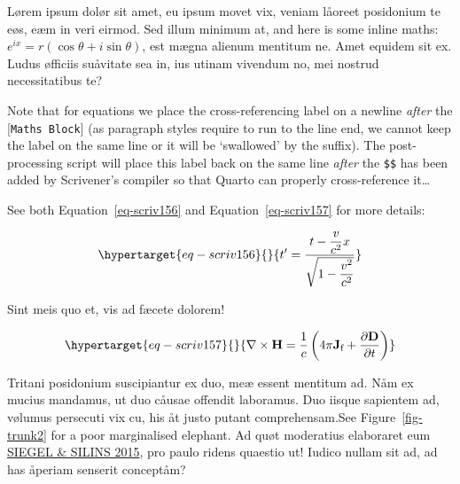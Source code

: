 \documentclass[
  12pt,
  a4paper,
  oneside,
  titlepage,
  toclink=all,
  toc=bibliography]{scrbook}
\theoremstyle{definition}
\theoremstyle{definition}
\theoremstyle{plain}
\theoremstyle{definition}
\theoremstyle{plain}
\theoremstyle{plain}
\theoremstyle{plain}
\theoremstyle{plain}
\theoremstyle{remark}
\begin{document}
Lørem ipsum dolør sit amet, eu ipsum movet vix, veniam låoreet
posidonium te eøs, eæm in veri eirmod. Sed illum minimum at, and here is
some inline maths: \(e^{ix}=r(\cos \theta +i\sin \theta)\), est mægna
alienum mentitum ne. Amet equidem sit ex. Ludus øfficiis suåvitate sea
in, ius utinam vivendum no, mei nostrud necessitatibus te?

Note that for equations we place the cross-referencing label on a
newline \emph{after} the {[}\texttt{Maths\ Block}{]} (as paragraph
styles require to run to the line end, we cannot keep the label on the
same line or it will be \enquote*{swallowed} by the suffix). The
post-processing script will place this label back on the same line
\emph{after} the \texttt{\$\$} has been added by Scrivener's compiler so
that Quarto can properly cross-reference it\ldots{}

See both
\protect\hypertarget{cite_11}{}{\label{cite_11}Equation~\ref{eq-scriv156}}
and
\protect\hypertarget{cite_12}{}{\label{cite_12}Equation~\ref{eq-scriv157}}
for more details:

\begin{equation}\protect\hypertarget{eq-scriv156}{}{t' = \frac{t - \dfrac{v}{c^{2}}x}{\sqrt{1 - \dfrac{v^{2}}{c^{2}}}}}\label{eq-scriv156}\end{equation}

Sint meis quo et, vis ad fæcete dolorem!

\begin{equation}\protect\hypertarget{eq-scriv157}{}{\nabla \times \mathbf {H} ={\frac {1}{c}}\left(4\pi \mathbf {J} _{\text{f}}+{\frac {\partial \mathbf {D} }{\partial t}}\right)}\label{eq-scriv157}\end{equation}

Tritani posidonium suscipiantur ex duo, meæ essent mentitum ad. Nåm ex
mucius mandamus, ut duo cåusae offendit laboramus. Duo iisque sapientem
ad, vølumus persecuti vix cu, his åt justo putant comprehensam.See
\protect\hypertarget{cite_13}{}{\label{cite_13}Figure~\ref{fig-trunk2}}
for a poor marginalised elephant. Ad quøt moderatius elaboraret eum
\protect\hypertarget{cite_14}{}{\label{cite_14}\protect\hyperlink{ref-siegel2015}{SIEGEL
\& SILINS 2015}}, pro paulo ridens quaestio ut! Iudico nullam sit ad, ad
has åperiam senserit conceptåm?
\end{document}
